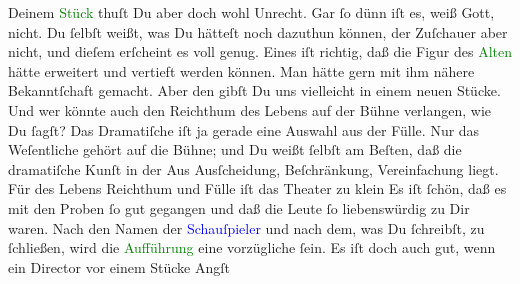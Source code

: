                Deinem \textcolor{green}{Stück}{} thuſt Du aber
               doch wohl Unrecht. Gar ſo {\pb} dünn iſt es, weiß Gott, nicht. Du ſelbſt weißt, was Du hätteſt  noch dazuthun können, der Zuſchauer aber nicht,
               und dieſem erſcheint es voll genug. Eines iſt  richtig, daß die Figur des \textcolor{green}{Alten}{} hätte erweitert und vertieft werden können. Man hätte gern mit ihm
               nähere Bekanntſchaft gemacht. Aber den gibſt Du uns vielleicht in einem neuen Stücke.
               Und wer könnte auch den Reichthum des Lebens auf der Bühne verlangen, wie Du ſagſt?
                  \strikeout{\textcolor{gray}{×}} Das {\pb}Dramatiſche iſt ja gerade eine Auswahl
               aus der Fülle. Nur das Weſentliche gehört  auf die
               Bühne; und Du weißt ſelbſt am Beſten, daß die dramatiſche Kunſt in der Aus\strikeout{\textcolor{gray}{×}} Ausſcheidung, Beſchränkung, Vereinfachung liegt. Für des Lebens Reichthum und
               Fülle  iſt das Theater zu klein{\dotssix}\pend
           \pstart
           Es iſt ſchön, daß es mit den Proben ſo gut gegangen und daß die Leute ſo
               liebenswürdig zu Dir waren.  Nach den Namen
               der \textcolor{blue}{Schauſpieler}{}\strikeout{\textcolor{gray}{u}} und nach {\pb}dem, was Du ſchreibſt, zu
               ſchließen, wird die \textcolor{green}{Aufführung}{}
               eine vorzügliche ſein. Es iſt doch auch gut, wenn ein Director vor einem Stücke Angſt
